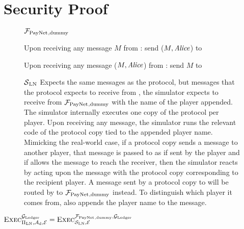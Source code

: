 \section{Security Proof}
  \begin{figure}[H]
    \begin{systembox}{$\mathcal{F}_{\mathrm{PayNet}}{}_{\mathrm{, dummy}}$}
      \begin{algorithmic}[1]
        \State Upon receiving any message $M$ from \alice:
        \Indent
            \State send ($M, \mathit{Alice}$) to \simulator
          \EndIf
        \EndIndent
        \Statex

        \State Upon receiving any message ($M, \mathit{Alice}$) from \simulator:
        \Indent
            \State send $M$ to \alice
          \EndIf
        \EndIndent
      \end{algorithmic}
    \end{systembox}
    \caption{}
    \label{alg:proof:fpaynet:dummy}
  \end{figure}

  \begin{figure}[H]
    \begin{simulatorbox}{$\mathcal{S}{}_{\mathrm{LN}}$}
      Expects the same messages as the protocol, but messages that the protocol
      expects to receive from \environment, the simulator expects to receive
      from $\mathcal{F}_{\mathrm{PayNet}}{}_{\mathrm{, dummy}}$ with the name of the player appended.
      The simulator internally executes one copy of the protocol per player.
      Upon receiving any message, the simulator runs the relevant code of the
      protocol copy tied to the appended player name. Mimicking the real-world
      case, if a protocol copy sends a message to another player, that message
      is passed to \adversary{} as if sent by the player and if \adversary{}
      allows the message to reach the receiver, then the simulator reacts by
      acting upon the message with the protocol copy corresponding to the
      recipient player. A message sent by a protocol copy to \environment{} will
      be routed by \simulator{} to $\mathcal{F}_{\mathrm{PayNet}}{}_{\mathrm{, dummy}}$ instead. To
      distinguish which player it comes from, \simulator{} also appends the
      player name to the message.
    \end{simulatorbox}
    \caption{}
    \label{alg:sim:ln}
  \end{figure}

  \begin{lemma}
    \label{lemma:dummy}
    $\textsc{Exec}^{\mathcal{G}_{\mathrm{Ledger}}}_{\Pi_{\mathrm{LN}}, \mathcal{A}_{\mathrm{d}},
    \mathcal{E}} = \textsc{Exec}^{\mathcal{F}_{\mathrm{PayNet}}{}_{\mathrm{, dummy}},
    \mathcal{G}_{\mathrm{Ledger}}}_{\mathcal{S}_{\mathrm{LN}}, \mathcal{E}}$
  \end{lemma}

